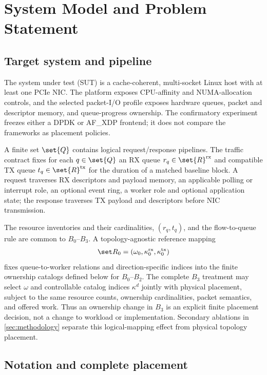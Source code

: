 \section{System Model and Problem Statement}
\label{sec:problem}

\subsection{Target system and pipeline}

The system under test (SUT) is a cache-coherent, multi-socket Linux host with at least one PCIe NIC. The platform exposes CPU-affinity and NUMA-allocation controls, and the selected packet-I/O profile exposes hardware queues, packet and descriptor memory, and queue-progress ownership. The confirmatory experiment freezes either a DPDK or AF\_XDP frontend; it does not compare the frameworks as placement policies.

A finite set $\set{Q}$ contains logical request/response pipelines. The traffic contract fixes for each $q\in\set{Q}$ an RX queue $r_q\in\set{R}^{\mathrm{rx}}$ and compatible TX queue $t_q\in\set{R}^{\mathrm{tx}}$ for the duration of a matched baseline block. A request traverses RX descriptors and payload memory, an applicable polling or interrupt role, an optional event ring, a worker role and optional application state; the response traverses TX payload and descriptors before NIC transmission.

The resource inventories and their cardinalities, $(r_q,t_q)$, and the flow-to-queue rule are common to $B_0$--$B_3$. A topology-agnostic reference mapping
\begin{equation}
 \set R_0=(\omega_0,\kappa^{\mathrm{rx}}_0,
 \kappa^{\mathrm{tx}}_0)
 \label{eq:reference-mapping}
\end{equation}
fixes queue-to-worker relations and direction-specific indices into the finite ownership catalogs defined below for $B_0$--$B_2$. The complete $B_3$ treatment may select $\omega$ and controllable catalog indices $\kappa^d$ jointly with physical placement, subject to the same resource counts, ownership cardinalities, packet semantics, and offered work. Thus an ownership change in $B_3$ is an explicit finite placement decision, not a change to workload or implementation. Secondary ablations in \cref{sec:methodology} separate this logical-mapping effect from physical topology placement.

\subsection{Notation and complete placement}

